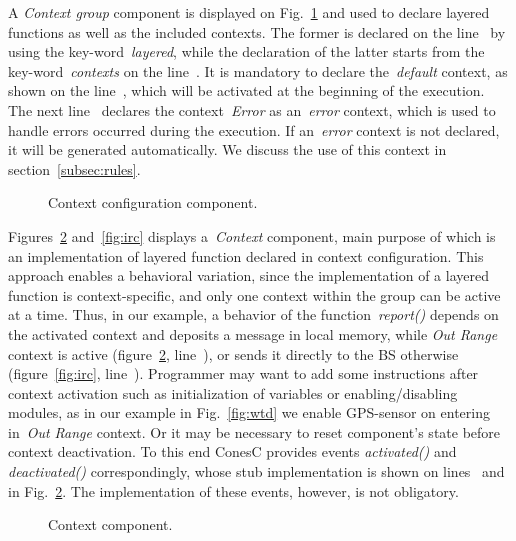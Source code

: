 A \emph{Context group} component is displayed on Fig.~\ref{fig:ccc} and used to declare layered
functions as well as the included contexts. The former is declared on the line~
by using the key-word~\emph{layered}, while the declaration of the latter starts from the
key-word~\emph{contexts} on the line~. It is mandatory to declare
the~\emph{default} context, as shown on the line~, which will be
activated at the beginning of the execution. The next line~ declares the
context~\emph{Error} as an~\emph{error} context, which is used to handle errors occurred
during the execution. If an~\emph{error} context is not declared, it will be generated automatically.
We discuss the use of this context in section~\ref{subsec:rules}.


\begin{figure}[!h]
\TheSbox
\caption{Context configuration
component.}
\label{fig:ccc}
\end{figure}

Figures~\ref{fig:cc} and~\ref{fig:irc} displays a~\emph{Context} component, main
purpose of which is an implementation of layered function declared in context configuration. 
This approach enables a behavioral variation, since the implementation of a layered function is
context-specific, and only one context within the group can be active at a time. Thus, in our
example, a behavior of the function~\emph{report()} depends on the activated context and
deposits a message in local memory, while \emph{Out Range} context
is active (figure~\ref{fig:cc}, line~),
or sends it directly to the BS otherwise (figure~\ref{fig:irc}, line~).
Programmer may want to add some instructions after
context activation such as initialization of variables or enabling/disabling
modules, as in our example in Fig.~\ref{fig:wtd} we enable GPS-sensor on entering
in~\emph{Out Range} context. Or it may be necessary to reset component's state before context
deactivation. To this end ConesC provides events \emph{activated()} and
\emph{deactivated()} correspondingly, whose stub implementation is shown on
lines~ and~ in Fig.~\ref{fig:cc}. The implementation of
these events, however, is not obligatory.


\begin{figure}[!h]
\TheSbox
\caption{Context component.}
\label{fig:cc}
\end{figure}

